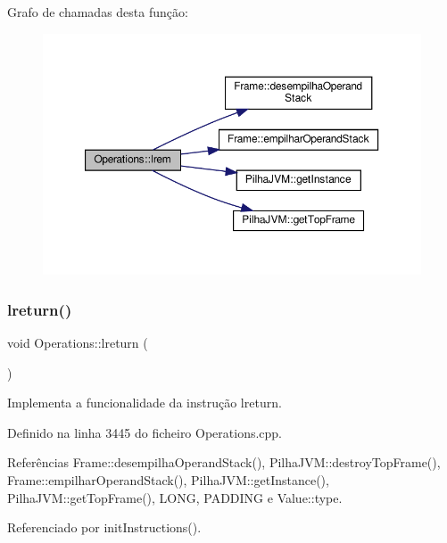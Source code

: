 Grafo de chamadas desta função\+:\nopagebreak
\begin{figure}[H]
\begin{center}
\leavevmode
\includegraphics[width=350pt]{classOperations_a437e4b34f2f1be8982d36f0cdf47f98c_cgraph}
\end{center}
\end{figure}
\mbox{\label{classOperations_adbc4db2dbfcae7185bc9b7a005e988ea}} 
\subsubsection{\texorpdfstring{lreturn()}{lreturn()}}
{\footnotesize\ttfamily void Operations\+::lreturn (\begin{DoxyParamCaption}{ }\end{DoxyParamCaption})\hspace{0.3cm}{\ttfamily [private]}}



Implementa a funcionalidade da instrução lreturn. 



Definido na linha 3445 do ficheiro Operations.\+cpp.



Referências Frame\+::desempilha\+Operand\+Stack(), Pilha\+J\+V\+M\+::destroy\+Top\+Frame(), Frame\+::empilhar\+Operand\+Stack(), Pilha\+J\+V\+M\+::get\+Instance(), Pilha\+J\+V\+M\+::get\+Top\+Frame(), L\+O\+NG, P\+A\+D\+D\+I\+NG e Value\+::type.



Referenciado por init\+Instructions().

